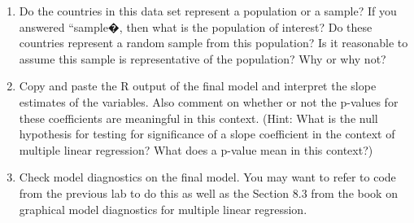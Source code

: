 \documentclass[11pt]{article}
\newcommand{\soln}[1]{ }	%
\begin{document}
\begin{enumerate}

\item Do the countries in this data set represent a population or a sample? If you answered ``sample�, then what is the population of interest? Do these countries represent a random sample from this population? Is it reasonable to assume this sample is representative of the population? Why or why not?

\item Copy and paste the R output of the final model and interpret the slope estimates of the variables. Also comment on whether or not the p-values for these coefficients are meaningful in this context. (Hint: What is the null hypothesis for testing for significance of a slope coefficient in the context of multiple linear regression? What does a p-value mean in this context?)

%
%
%

\soln{For each additional person in the population count we would expect compliance rate to increase on average by 0.000129\%. For each additional 0.001 in HDI we would expect compliance rate to increase on average by 0.1356\%. Both variables are significant predictors.}

\item Check model diagnostics on the final model. You may want to refer to code from the previous lab to do this as well as the Section 8.3 from the book on graphical model diagnostics for multiple linear regression.


\end{enumerate}
\end{document}
